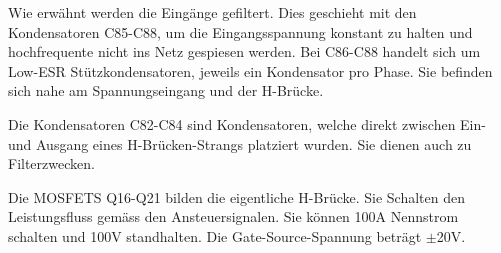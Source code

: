 Wie erwähnt werden die Eingänge gefiltert. Dies geschieht mit den Kondensatoren C85-C88, um die Eingangsspannung konstant zu halten und hochfrequente nicht ins Netz gespiesen werden.
Bei C86-C88 handelt sich um Low-ESR Stützkondensatoren, jeweils ein Kondensator pro Phase.
Sie befinden sich nahe am Spannungseingang und der H-Brücke.

Die Kondensatoren C82-C84 sind Kondensatoren, welche direkt zwischen Ein- und Ausgang eines H-Brücken-Strangs platziert wurden.
Sie dienen auch zu Filterzwecken.

Die MOSFETS Q16-Q21 bilden die eigentliche H-Brücke. Sie Schalten den Leistungsfluss gemäss den Ansteuersignalen. Sie können 100A Nennstrom schalten und 100V standhalten. Die Gate-Source-Spannung beträgt $\pm$20V.